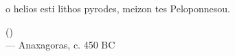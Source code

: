 \begin{flushright}
\itshape
\begin{hangleftquote}{\QGROpen}{\QGRClose}
o helios esti lithos pyrodes, meizon tes Peloponnesou.
\end{hangleftquote}
\par\smallskip
\normalfont ()\\
 — Anaxagoras, c. 450 BC
\end{flushright}
